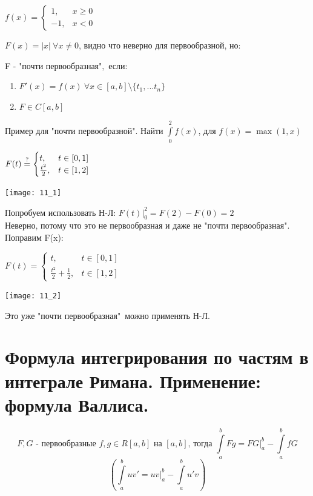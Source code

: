 \documentclass[matan]{subfiles}
\begin{document}
  \begin{example}
      $f(x) =
       \begin{cases}
         1,& x \geqslant 0
         \\
         -1,& x < 0
       \end{cases}$

      $F(x) = |x| \ \forall x \neq 0$, видно что неверно для первообразной, но:
      \begin{definition}
          F - "почти первообразная"$,$ если:
          \begin{enumerate}
              \item $F'(x) = f(x)\ \forall x \in [a,b] \setminus \{t_1, ... t_n\}$
              \item $F \in C[a,b]$
          \end{enumerate}
      \end{definition}

      \begin{example}
          Пример для "почти первообразной". Найти $\int\limits_0^2 f(x)$, для $f(x) = \max(1,x)$

          $F(t) \overset{?}{=}
           \begin{cases}
             t,& t \in [0,1]
             \\
             \frac{t^2}{2},& t \in [1,2]
           \end{cases}$

          \texttt{[image: 11\_1]}

          Попробуем использовать Н-Л: $F(t) \big|_0^2 = F(2) - F(0) = 2$ \\Неверно, потому что это не первообразная и даже не "почти первообразная". Поправим F(x):

          $F(t) =
           \begin{cases}
             t,& t \in [0,1]
             \\
             \frac{t^2}{2} + \frac{1}{2},& t \in [1,2]
           \end{cases}$

          \texttt{[image: 11\_2]}

          Это уже "почти первообразная"\ можно применять Н-Л.
      \end{example}
  \end{example}

  \newpage
  \section{Формула интегрирования по частям в интеграле Римана. Применение: формула Валлиса.}
  \hypertarget{12q}{}
  \begin{Theorem}
      \[\text{$F,G$ - первообразные $f,g \in R[a,b]$ на $[a,b]$, тогда } \int\limits_a^b F g = F G |_a^b-\int\limits_a^b f G\]
      $$(\int\limits_a^b u v' = u v |_a^b - \int\limits_a^b u' v)$$
  \end{Theorem}
\end{document}
